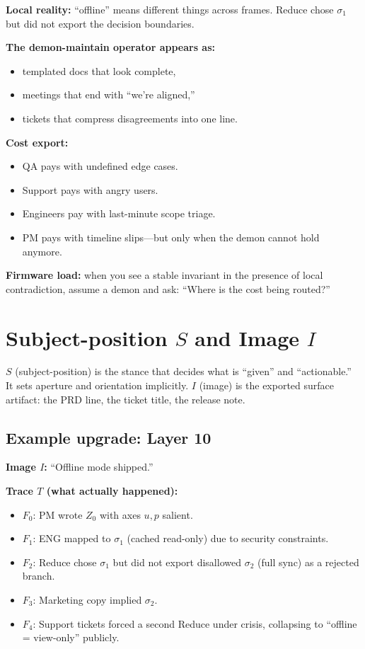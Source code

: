 \documentclass[11pt]{article}
\begin{document}
\textbf{Local reality:} ``offline'' means different things across frames. Reduce chose $\sigma_1$ but did not export the decision boundaries.

\textbf{The demon-maintain operator appears as:}
\begin{itemize}[leftmargin=2em]
  \item templated docs that look complete,
  \item meetings that end with ``we're aligned,''
  \item tickets that compress disagreements into one line.
\end{itemize}

\textbf{Cost export:}
\begin{itemize}[leftmargin=2em]
  \item QA pays with undefined edge cases.
  \item Support pays with angry users.
  \item Engineers pay with last-minute scope triage.
  \item PM pays with timeline slips---but only when the demon cannot hold anymore.
\end{itemize}

\textbf{Firmware load:} when you see a stable invariant in the presence of local contradiction, assume a demon and ask: ``Where is the cost being routed?''

\section{Subject-position $S$ and Image $I$}

$S$ (subject-position) is the stance that decides what is ``given'' and ``actionable.'' It sets aperture and orientation implicitly. $I$ (image) is the exported surface artifact: the PRD line, the ticket title, the release note.

\subsection{Example upgrade: Layer 10}

\textbf{Image $I$:} ``Offline mode shipped.''

\textbf{Trace $T$ (what actually happened):}
\begin{itemize}[leftmargin=2em]
  \item $F_0$: PM wrote $Z_0$ with axes $u,p$ salient.
  \item $F_1$: ENG mapped to $\sigma_1$ (cached read-only) due to security constraints.
  \item $F_2$: Reduce chose $\sigma_1$ but did not export disallowed $\sigma_2$ (full sync) as a rejected branch.
  \item $F_3$: Marketing copy implied $\sigma_2$.
  \item $F_4$: Support tickets forced a second Reduce under crisis, collapsing to ``offline = view-only'' publicly.
\end{itemize}
\end{document}
